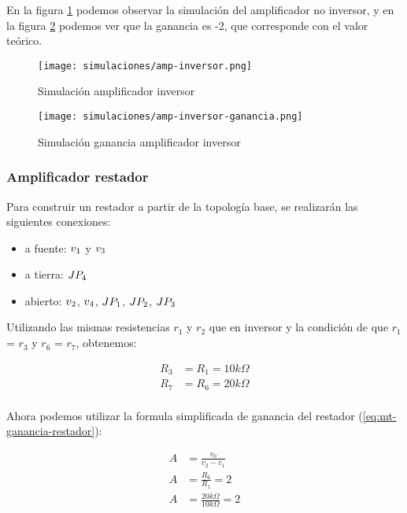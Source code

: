 En la figura \ref{fig:sim-amp-inversor} podemos observar la simulación del amplificador no inversor, y en la figura \ref{fig:sim-amp-inversor-ganancia} podemos ver que la ganancia es -2, que corresponde con el valor teórico.

\begin{figure}[ht]
    \centering
    \texttt{[image: simulaciones/amp-inversor.png]}
    \caption{Simulación amplificador inversor}
    \label{fig:sim-amp-inversor}
\end{figure}

\begin{figure}[ht]
    \centering
    \texttt{[image: simulaciones/amp-inversor-ganancia.png]}
    \caption{Simulación ganancia amplificador inversor}
    \label{fig:sim-amp-inversor-ganancia}
\end{figure}

\subsubsection{Amplificador restador}

Para construir un restador a partir de la topología base, se realizarán las siguientes conexiones:

\begin{itemize}
    \item a fuente: $\volt{1}$ y $\volt{3}$
    \item a tierra: $\jumper{4}$
    \item abierto: $\volt{2}$, $\volt{4}$, $\jumper{1}$, $\jumper{2}$, $\jumper{3}$
\end{itemize}

\newcommand{\res}[1]{$r_{#1}$}

Utilizando las mismas resistencias \res{1} y \res{2} que en inversor  y la condición de que \res{1} = \res{3} y \res{6} = \res{7}, obtenemos:  

\begin{align*}
    R_3 &= R_1 = 10k\Omega \\
    R_7 &= R_6 = 20k\Omega \\
\end{align*}

Ahora podemos utilizar la formula simplificada de ganancia del restador (\ref{eq:mt-ganancia-restador}):


\begin{align*}
    A &= \frac{v_0}{v_2 - v_1} \\
    A & = \frac{R_6}{R_1} = 2 \\
    A &= \frac{20k\Omega}{10k\Omega} = 2
\end{align*}

